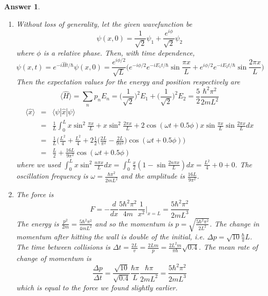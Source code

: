 \documentclass[a4paper]{article}
\newtheorem{ans}{Answer}[subsection]
\theoremstyle{new}
\begin{document}
\begin{ans}
\begin{enumerate}[label=(\alph*)]
If the well is finite, $\psi$ and $\psi'$ must be continuous on the wall. Suppose the wall is sufficiently large to have at least one bound state, then the wavelengths within the well would increase such that $|\psi(x>L)|^2>0$ and $|\psi(x<0)|^2>0$, but appear exponentially decaying with $e^{-q|x|}$, where $\frac{\hbar^2q^2}{2m}=E-V$. In particular, when $E=V$, $\psi''=0$, i.e. point on inflexion on the walls.
\item Without loss of generality, let the given wavefunction be
$$\psi(x,0)=\frac{1}{\sqrt{2}}\psi_1+\frac{e^{i\phi}}{\sqrt{2}}\psi_2$$
where $\phi$ is a relative phase. Then, with time dependence,
$$\psi(x,t)=e^{-i\hat{H}t/\hbar}\psi(x,0)=\frac{e^{i\phi/2}}{\sqrt{L}}\bigg(e^{-i\phi/2}e^{-iE_1t/\hbar}\sin\frac{\pi x}{L}+e^{i\phi/2}e^{-iE_2t/\hbar}\sin\frac{2\pi x}{L}\bigg)$$
Then the expectation values for the energy and position respectively are
$$\langle\hat{H}\rangle=\sum_np_nE_n=\bigg(\frac{1}{\sqrt{2}}\bigg)^2E_1+\bigg(\frac{1}{\sqrt{2}}\bigg)^2E_2=\frac{5}{2}\frac{\hbar^2\pi^2}{2mL^2}$$
\begin{eqnarray}
\langle\hat{x}\rangle&=&\langle\psi|\hat{x}|\psi\rangle\nonumber\\&=&\frac{1}{L}\int_0^Lx\sin^2\frac{\pi x}{L}+x\sin^2\frac{2\pi x}{L}+2\cos(\omega t+0.5\phi)x\sin\frac{\pi x}{L}\sin\frac{2\pi x}{L}dx\nonumber\\&=&\frac{1}{L}\bigg(\frac{L^2}{4}+\frac{L^2}{4}+2\frac{1}{2}\bigg(\frac{2L}{\pi^2}-\frac{2L}{9\pi^2}\bigg)\cos(\omega t+0.5\phi)\bigg)\nonumber\\&=&\frac{L}{2}+\frac{16L}{9\pi^2}\cos(\omega t+0.5\phi)\nonumber
\end{eqnarray}
where we used $\int_0^Lx\sin^2\frac{n\pi x}{L}dx=\int_0^L\frac{x}{2}(1-\sin\frac{2n\pi x}{L})dx=\frac{L^2}{4}+0+0$. The oscillation frequency is $\omega=\frac{\hbar\pi^2}{2mL^2}$ and the amplitude is $\frac{16L}{9\pi^2}$.
\item The force is
$$F=-\frac{d}{dx}\frac{5\hbar^2\pi^2}{4m}\frac{1}{x^2}\bigg|_{x=L}=\frac{5\hbar^2\pi^2}{2mL^3}$$
The energy is $\frac{p^2}{2m}=\frac{5\hbar^2\pi^2}{4mL^2}$ and so the momentum is $p=\sqrt{\frac{5\hbar^2\pi^2}{2L^2}}$. The change in momentum after hitting the wall is double of the initial, i.e. $\Delta p=\sqrt{10}\frac{\hbar}{\pi}{L}$. The time between collisions is $\Delta t=\frac{2L}{v}=\frac{2Lm}{p}=\frac{2L^2m}{\pi\hbar}\sqrt{0.4}$. The mean rate of change of momentum is $$\frac{\Delta p}{\Delta t}=\frac{\sqrt{10}}{\sqrt{0.4}}\frac{\hbar\pi}{L}\frac{\hbar\pi}{2mL^2}=\frac{5\hbar^2\pi^2}{2mL^3}$$
which is equal to the force we found slightly earlier.
\end{enumerate}
\end{ans}
\end{document}
